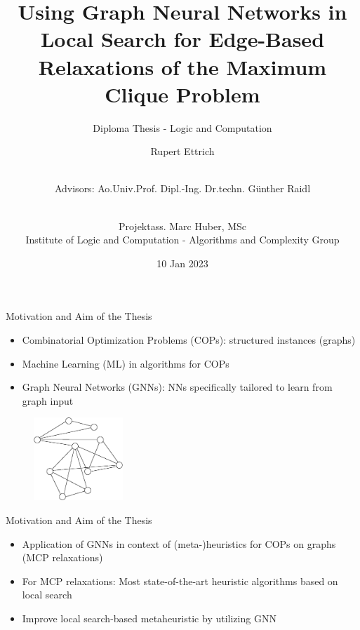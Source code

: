 \documentclass{beamer}
\title{Using Graph Neural Networks in Local Search for Edge-Based Relaxations of the Maximum Clique Problem}
\subtitle{Diploma Thesis - Logic and Computation}
\author{Rupert Ettrich \and \\ \scriptsize Advisors:  Ao.Univ.Prof. Dipl.-Ing. Dr.techn. Günther Raidl \and \\ Projektass. Marc Huber, MSc \\ Institute of Logic and Computation - Algorithms and Complexity Group}
\date{10 Jan 2023}
\begin{document}
\maketitle

    

\begin{frame}{Motivation and Aim of the Thesis}
    \begin{itemize}
        \item<1-> Combinatorial Optimization Problems (COPs): structured instances (graphs)
        \item<2-> Machine Learning (ML) in algorithms for COPs
        \item<3-> Graph Neural Networks (GNNs): NNs specifically tailored to learn from graph input 
    \end{itemize}
\begin{figure}
    \centering
    \includegraphics[width=0.3\textwidth]{graphics/graph1.eps}
\end{figure}
\end{frame}

\begin{frame}{Motivation and Aim of the Thesis}
    \begin{itemize}
        \item<1-> Application of GNNs in context of (meta-)heuristics for COPs on graphs (MCP relaxations)
        \item<2-> For MCP relaxations: Most state-of-the-art heuristic algorithms based on local search
        \item<3-> Improve local search-based metaheuristic by utilizing GNN
    \end{itemize}
\end{frame}
\end{document}
